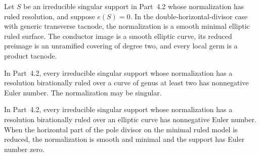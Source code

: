 \begin{proposition}[P4R.11]\hypertarget{tag-02Y4}{}\label{night:P4R.11}\label{stmt:P4R.11}


Let $S$ be an irreducible singular support in Part~4.2 whose
normalization has ruled resolution, and suppose $e(S)=0$.
In the double-horizontal-divisor case with generic transverse
tacnode, the normalization is a smooth minimal elliptic ruled
surface. The conductor image is a smooth elliptic curve, its
reduced preimage is an unramified covering of degree two,
and every local germ is a product tacnode.
\end{proposition}

\begin{proposition}[P4R.7]\hypertarget{tag-02YJ}{}\label{night:P4R.7}\label{stmt:P4R.7}


In Part~4.2, every irreducible singular
support whose normalization has a
resolution birationally ruled over a
curve of genus at least two has
nonnegative Euler number. The
normalization may be singular.
\end{proposition}

\begin{proposition}[P4R.9]\hypertarget{tag-02YL}{}\label{night:P4R.9}\label{stmt:P4R.9}


In Part~4.2, every irreducible singular
support whose normalization has a
resolution birationally ruled over an
elliptic curve has nonnegative Euler
number. When the horizontal part of
the pole divisor on the minimal ruled
model is reduced, the normalization
is smooth and minimal and the support
has Euler number zero.
\end{proposition}

